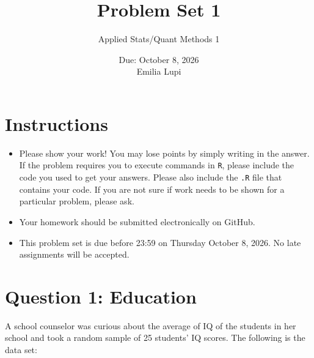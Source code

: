 \documentclass[12pt,letterpaper]{article}
\title{Problem Set 1}
\date{Due: October 8, 2026\\[0.5em]Emilia Lupi}
\author{Applied Stats/Quant Methods 1}
\begin{document}
	\maketitle
	
	\section*{Instructions}
	\begin{itemize}
		\item Please show your work! You may lose points by simply writing in the answer. If the problem requires you to execute commands in \texttt{R}, please include the code you used to get your answers. Please also include the \texttt{.R} file that contains your code. If you are not sure if work needs to be shown for a particular problem, please ask.
		\item Your homework should be submitted electronically on GitHub.
		\item This problem set is due before 23:59 on Thursday October 8, 2026. No late assignments will be accepted.
	\end{itemize}
	
	\vspace{1cm}
	\section*{Question 1: Education}
	
	A school counselor was curious about the average of IQ of the students in her school and took a random sample of 25 students' IQ scores. The following is the data set:\\
	\vspace{.5cm}
	
	
	
	
	
	
	\vspace{1cm}
	
\end{document}
